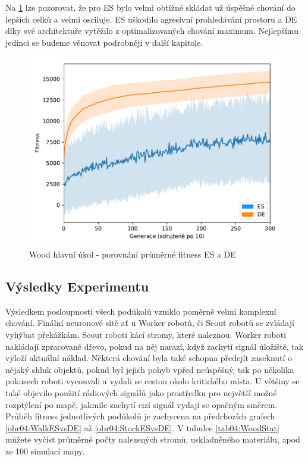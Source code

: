 	Na \ref{obr04:CoopESvsDE} lze pozorovat, že pro ES bylo velmi obtížné skládat už úspěšné chování do lepších celků a velmi osciluje. ES uškodilo agresivní prohledávání prostoru a DE díky své architektuře vytěžilo z optimalizovaných chování maximum. Nejlepšímu jedinci se budeme věnovat podrobněji v další kapitole. 
		\clearpage
		\begin{figure}[t]\centering
		\includegraphics[width=\columnwidth]{../img/WoodMap/DEvsES/WoodCoopMem}
		\caption{Wood hlavní úkol  - porovnání průměrné fitness ES a DE}
		\label{obr04:CoopESvsDE}
	\end{figure}
	\newpage
	
	\subsection*{Výsledky Experimentu}
	Výsledkem posloupnosti všech podúkolů vzniklo poměrně velmi komplexní chování. Finální neuronové sítě ať u Worker robotů, či Scout robotů se zvládají vyhýbat překážkám. Scout roboti kácí stromy, které naleznou. Worker roboti nakládají zpracované dřevo, pokud na něj narazí, když zachytí signál úložiště, tak vyloží aktuální náklad. Některá chování byla také schopna předejít zaseknutí o nějaký shluk objektů, pokud byl  jejich pohyb vpřed neúspěšný, tak po několika pokusech roboti vycouvali a vydali se cestou okolo kritického místa. U většiny se také objevilo použití rádiových signálů jako prostředku pro největší možné rozptýlení po mapě, jakmile zachytí cizí signál vydají se opačným směrem. Průběh fitness jednotlivých podúkolů je zachycena na předchozích grafech \ref{obr04:WalkESvsDE} až \ref{obr04:StockESvsDE}. V tabulce \ref{tab04:WoodStat} můžete vyčíst průměrné počty nalezených stromů, uskladněného materiálu, apod ze 100 simulací mapy. 
	
